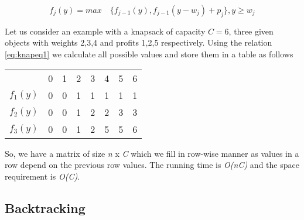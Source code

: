 \documentclass{article}
\begin{document}
\begin{equation} \label{eq:knapeq1}
	f_{j}(y) = max \quad \{f_{j-1}(y), f_{j-1}(y-w_{j}) + p_{j}\}, {y \ge w_{j}}
\end{equation}

Let us consider an example with a knapsack of capacity $C = 6$, three given objects with weights 2,3,4 and profits 1,2,5 respectively. Using the relation \ref{eq:knapeq1} we calculate all possible values and store them in a table as follows
\begin{center}
	\begin{tabular}{*8c}
		& 0 &1 &2 &3 &4 &5 &6 \\\cline{2-8}
		$f_{1}(y)$ &\multicolumn{1}{|c|}{0} &\multicolumn{1}{|c|}{0} &\multicolumn{1}{|c|}{1} &\multicolumn{1}{|c|}{1} &\multicolumn{1}{|c|}{1} &\multicolumn{1}{|c|}{1} &\multicolumn{1}{|c|}{1} \\\cline{2-8}
		$f_{2}(y)$ &\multicolumn{1}{|c|}{0} &\multicolumn{1}{|c|}{0} &\multicolumn{1}{|c|}{1} &\multicolumn{1}{|c|}{2} &\multicolumn{1}{|c|}{2} &\multicolumn{1}{|c|}{3} &\multicolumn{1}{|c|}{3} \\\cline{2-8}
		$f_{3}(y)$ &\multicolumn{1}{|c|}{0} &\multicolumn{1}{|c|}{0} &\multicolumn{1}{|c|}{1} &\multicolumn{1}{|c|}{2} &\multicolumn{1}{|c|}{5} &\multicolumn{1}{|c|}{5} &\multicolumn{1}{|c|}{6} \\\cline{2-8}
	\end{tabular}
\end{center}
So, we have a matrix of size \textit{n} x \textit{C} which we fill in row-wise manner as values in a row depend on the previous row values. The running time is \textit{O(nC)} and the space requirement is \textit{O(C)}.

\subsection{Backtracking}
\end{document}
